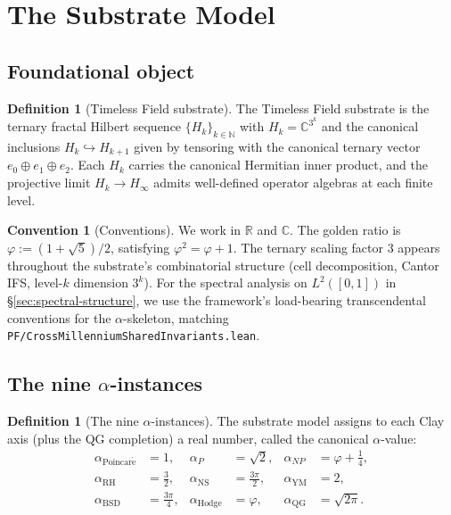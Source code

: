 \documentclass[11pt,a4paper,reqno]{amsart}
\theoremstyle{plain}
\theoremstyle{definition}
\newtheorem{definition}[theorem]{Definition}
\newtheorem{convention}[theorem]{Convention}
\theoremstyle{remark}
\newcommand{\aPo}{\alpha_{\mathrm{Poincar\acute{e}}}}
\newcommand{\aP}{\alpha_{P}}
\newcommand{\aNP}{\alpha_{NP}}
\newcommand{\aRH}{\alpha_{\mathrm{RH}}}
\newcommand{\aYM}{\alpha_{\mathrm{YM}}}
\newcommand{\aNS}{\alpha_{\mathrm{NS}}}
\newcommand{\aBSD}{\alpha_{\mathrm{BSD}}}
\newcommand{\aHodge}{\alpha_{\mathrm{Hodge}}}
\newcommand{\aQG}{\alpha_{\mathrm{QG}}}
\newcommand{\code}[1]{\texttt{#1}}
\newcommand{\Hk}{H_{k}}
\begin{document}
\section{The Substrate Model}
\label{sec:substrate-model}

\subsection{Foundational object}
\label{subsec:foundational-object}

\begin{definition}[Timeless Field substrate]
\label{def:timeless-field}
The Timeless Field substrate is the ternary fractal Hilbert sequence
$\{\Hk\}_{k \in \mathbb{N}}$ with $\Hk = \mathbb{C}^{3^{k}}$ and the
canonical inclusions $\Hk \hookrightarrow H_{k+1}$ given by tensoring
with the canonical ternary vector $e_{0} \oplus e_{1} \oplus e_{2}$.
Each $\Hk$ carries the canonical Hermitian inner product, and the
projective limit $\Hk \to H_{\infty}$ admits well-defined operator
algebras at each finite level.
\end{definition}

\begin{convention}[Conventions]
\label{conv:conventions}
We work in $\mathbb{R}$ and $\mathbb{C}$. The golden ratio is
$\varphi := (1 + \sqrt{5})/2$, satisfying $\varphi^{2} = \varphi + 1$.
The ternary scaling factor $3$ appears throughout the substrate's
combinatorial structure (cell decomposition, Cantor IFS, level-$k$
dimension $3^{k}$). For the spectral analysis on $L^{2}([0,1])$ in
\S\ref{sec:spectral-structure}, we use the framework's load-bearing
transcendental conventions for the $\alpha$-skeleton, matching
\code{PF/CrossMillenniumSharedInvariants.lean}.
\end{convention}

\subsection{The nine \texorpdfstring{$\alpha$}{alpha}-instances}
\label{subsec:nine-alpha}

\begin{definition}[The nine $\alpha$-instances]
\label{def:nine-alphas}
The substrate model assigns to each Clay axis (plus the QG completion)
a real number, called the canonical $\alpha$-value:
\begin{equation}
\label{eq:nine-alphas}
\begin{aligned}
\aPo  &= 1, &
\aP   &= \sqrt{2}, &
\aNP  &= \varphi + \tfrac{1}{4},\\
\aRH  &= \tfrac{3}{2}, &
\aNS  &= \tfrac{3\pi}{2}, &
\aYM  &= 2,\\
\aBSD &= \tfrac{3\pi}{4}, &
\aHodge &= \varphi, &
\aQG  &= \sqrt{2\pi}.
\end{aligned}
\end{equation}
\end{definition}
\end{document}
